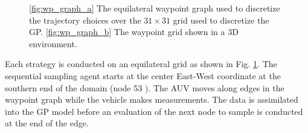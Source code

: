
\begin{figure}[!h] 
\centering 
{}
\hfill
{}
\caption{\ref{fig:wp_graph_a} The equilateral waypoint graph used to discretize the
trajectory choices over the $31\times31$ grid used to discretize the GP.
\ref{fig:wp_graph_b} The waypoint grid shown in a 3D environment.}
\label{fig:wp_graph}
\end{figure}

Each strategy is conducted on an equilateral grid as shown in
Fig. \ref{fig:wp_graph}. The sequential sampling agent starts at the
center East-West coordinate at the southern end of the domain (node 53
). The
AUV moves along edges in the waypoint graph while the vehicle makes
measurements. The data is assimilated into the GP model before an
evaluation of the next node to sample is conducted at the end of the
edge.

